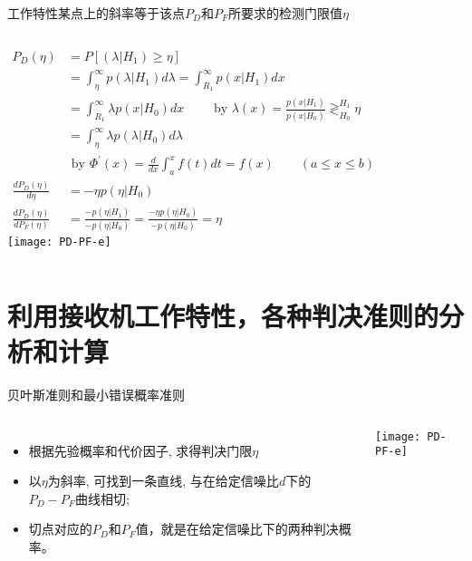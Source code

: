 \begin{frame}[shrink]{工作特性某点上的斜率等于该点$P_D$和$P_F$所要求的检测门限值$\eta$}
\begin{columns}[T]
	\small
	\begin{align*}
	P_D(\eta) &=P[(\lambda|H_1)\ge\eta]&\\
	&=\int_{\eta}^{\infty}p(\lambda|H_1)d\lambda=\int_{R_1}^{\infty}p(x|H_1)dx&\\
	&=\int_{R_1}^{\infty}\lambda p(x|H_0)dx \qquad \text{ by }\lambda(x)=\frac{p(x|H_1)}{p(x|H_0)}\mathop{\gtrless}_{H_0}^{H_1}\eta&\\
	&=\int_{\eta}^{\infty}\lambda p(\lambda|H_0)d\lambda&\\
	&\text{ by } \Phi^\prime(x)=\frac{d}{dx}\int_a^xf(t)dt=f(x)\qquad (a\le x\le b) \\
	\frac{dP_D(\eta)}{d\eta} &=-\eta p(\eta|H_0)\\
	\frac{dP_D(\eta)}{dP_F(\eta)} &=\frac{-p(\eta|H_1)}{-p(\eta|H_0)}=\frac{-\eta p(\eta|H_0)}{-p(\eta|H_0)}=\eta
	\end{align*}
	\texttt{[image: PD-PF-e]}
\end{columns}\end{frame}

\section{利用接收机工作特性，各种判决准则的分析和计算}

\begin{frame}[shrink]{贝叶斯准则和最小错误概率准则}
\begin{columns}[T]
		\begin{itemize}
		\item 根据先验概率和代价因子, 求得判决门限$\eta$
		\item 以$\eta$为斜率, 可找到一条直线, 与在给定信噪比$d$下的$P_D-P_F$曲线相切;
		\item 切点对应的$P_D$和$P_F$值，就是在给定信噪比下的两种判决概率。
	\end{itemize}
	\texttt{[image: PD-PF-e]}
\end{columns}
\end{frame}

